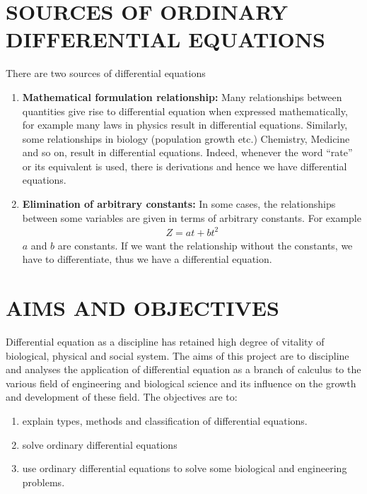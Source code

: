 \documentclass[11pt]{report}
\newcommand{\bt}[1]{\textbf{#1}}
\renewcommand{\labelenumi}{\arabic{enumi})}
\begin{document}
	
	\section{SOURCES OF ORDINARY DIFFERENTIAL EQUATIONS}
	There are two sources of differential equations
	\begin{enumerate}
		\item \bt{Mathematical formulation relationship:} Many relationships between quantities give rise to differential equation when expressed mathematically, for example many laws in physics result in differential equations. Similarly, some relationships in biology (population growth etc.) Chemistry, Medicine and so on, result in differential equations. Indeed, whenever the word ``rate'' or its equivalent is used, there is derivations and hence we have differential equations.
		
		\item \bt{Elimination of arbitrary constants:} In some cases, the relationships between some variables are given in terms of arbitrary constants. For example 
		\begin{eqnarray*}
			Z = at +bt^2
		\end{eqnarray*}
		$a$ and $b$ are constants. If we want the relationship without the constants, we have to differentiate, thus we have a differential equation. 
	\end{enumerate}
	
	\section{AIMS AND OBJECTIVES }	
	Differential equation as a discipline has retained high degree of vitality of biological, physical and social system. The aims of this project are to discipline and analyses the application of differential equation as a branch of calculus to the various field of engineering and biological science and its influence on the growth and development of these field. The objectives are to:
	\begin{enumerate}
		\renewcommand{\labelenumi}{\roman{enumi}.}
		\item explain types, methods and classification of differential equations.
		\item solve ordinary differential equations
		\item use ordinary differential equations to solve some  biological and engineering problems.
	\end{enumerate}	
		
\end{document}
